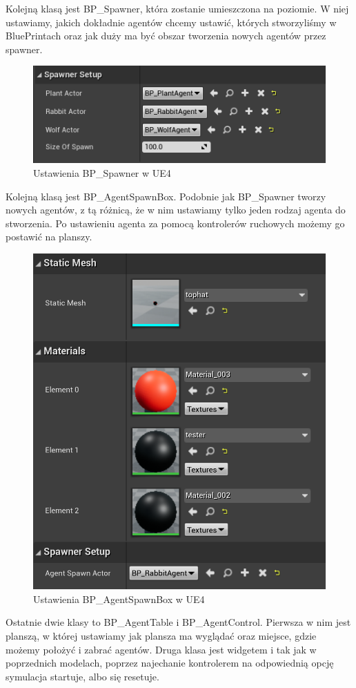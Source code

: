 \documentclass[a4paper,12pt,reqno]{article}
\begin{document}
Kolejną klasą jest BP\_Spawner, która zostanie umieszczona na poziomie. W niej ustawiamy, jakich dokładnie agentów chcemy ustawić, których stworzyliśmy w BluePrintach oraz jak duży ma być obszar tworzenia nowych agentów przez spawner.

\begin{figure}[H]%
\centering
\includegraphics[width=0.6\columnwidth]{graphics//agent/BP_SpawnerAgent.png}
\caption{Ustawienia BP\_Spawner w UE4 
\label{BPExample}}%
%
\qquad
\end{figure} 

Kolejną klasą jest BP\_AgentSpawnBox. Podobnie jak BP\_Spawner tworzy nowych agentów, z tą różnicą, że w nim ustawiamy tylko jeden rodzaj agenta do stworzenia. Po ustawieniu agenta za pomocą kontrolerów ruchowych możemy go postawić na planszy.

\begin{figure}[H]%
\centering
\includegraphics[width=0.60\columnwidth]{graphics//agent/BP_AgentSpawnBox.png}
\caption{Ustawienia  BP\_AgentSpawnBox w UE4 
\label{BPExample}}%
%
\qquad
\end{figure} 

Ostatnie dwie klasy to BP\_AgentTable i BP\_AgentControl. Pierwsza w nim jest planszą, w której ustawiamy jak plansza ma wyglądać oraz miejsce, gdzie możemy położyć i zabrać agentów. Druga klasa jest widgetem i tak jak w poprzednich modelach, poprzez najechanie kontrolerem na odpowiednią opcję symulacja startuje, albo się resetuje.
\end{document}
